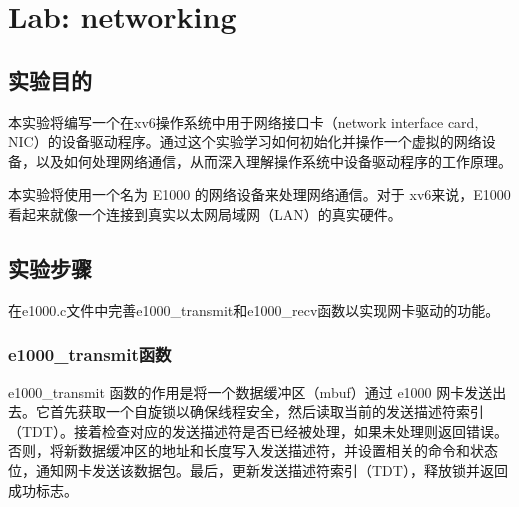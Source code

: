 \section{Lab: networking}

\subsection{实验目的}

本实验将编写一个在xv6操作系统中用于网络接口卡（network interface card, NIC）的设备驱动程序。通过这个实验学习如何初始化并操作一个虚拟的网络设备，以及如何处理网络通信，从而深入理解操作系统中设备驱动程序的工作原理。

本实验将使用一个名为 E1000 的网络设备来处理网络通信。对于 xv6来说，E1000 看起来就像一个连接到真实以太网局域网（LAN）的真实硬件。

\subsection{实验步骤}

在e1000.c文件中完善e1000\_transmit和e1000\_recv函数以实现网卡驱动的功能。

\subsubsection*{e1000\_transmit函数}
e1000\_transmit 函数的作用是将一个数据缓冲区（mbuf）通过 e1000 网卡发送出去。它首先获取一个自旋锁以确保线程安全，然后读取当前的发送描述符索引（TDT）。接着检查对应的发送描述符是否已经被处理，如果未处理则返回错误。否则，将新数据缓冲区的地址和长度写入发送描述符，并设置相关的命令和状态位，通知网卡发送该数据包。最后，更新发送描述符索引（TDT），释放锁并返回成功标志。


